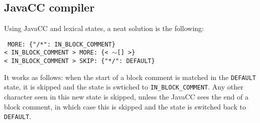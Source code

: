 \documentclass[11pt]{article}
\begin{document}
\subsection{JavaCC compiler}
Using JavaCC and lexical states, a neat solution is the following:

\noindent\texttt{
MORE: \{"/*": IN\_BLOCK\_COMMENT\}\\
< IN\_BLOCK\_COMMENT > MORE: \{< \(\sim\)[] >\}\\
< IN\_BLOCK\_COMMENT > SKIP: \{"*/": DEFAULT\}}

It works as follows: when the start of a block comment is matched in the  \texttt{DEFAULT} state, it is skipped and the state is swtiched to \texttt{IN\_BLOCK\_COMMENT}.
Any other character seen in this new state is skipped, unless the JavaCC sees the end of a block comment, in which case this is skipped and the state is switched back to \texttt{DEFAULT}.
\end{document}
